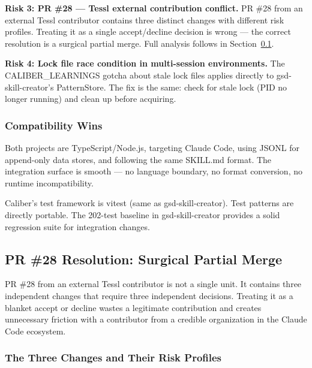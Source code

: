 \documentclass[11pt,letterpaper]{article}
\begin{document}
\textbf{Risk 3: PR \#28 — Tessl external contribution conflict.} PR \#28 from an external Tessl contributor contains three distinct changes with different risk profiles. Treating it as a single accept/decline decision is wrong — the correct resolution is a surgical partial merge. Full analysis follows in Section~\ref{sec:pr28}.

\textbf{Risk 4: Lock file race condition in multi-session environments.} The CALIBER\_LEARNINGS gotcha about stale lock files applies directly to gsd-skill-creator's PatternStore. The fix is the same: check for stale lock (PID no longer running) and clean up before acquiring.

\subsubsection{Compatibility Wins}

Both projects are TypeScript/Node.js, targeting Claude Code, using JSONL for append-only data stores, and following the same SKILL.md format. The integration surface is smooth — no language boundary, no format conversion, no runtime incompatibility.

Caliber's test framework is vitest (same as gsd-skill-creator). Test patterns are directly portable. The 202-test baseline in gsd-skill-creator provides a solid regression suite for integration changes.

\subsection{PR \#28 Resolution: Surgical Partial Merge}
\label{sec:pr28}

PR \#28 from an external Tessl contributor is not a single unit. It contains three independent changes that require three independent decisions. Treating it as a blanket accept or decline wastes a legitimate contribution and creates unnecessary friction with a contributor from a credible organization in the Claude Code ecosystem.

\subsubsection{The Three Changes and Their Risk Profiles}
\end{document}
